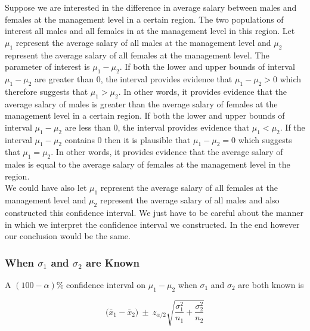 Suppose we are interested in the difference in average salary between males and females at the management level in a certain region. The two populations of interest all males and all females in at the management level in this region. Let $\mu_{1}$ represent the average salary of all males at the management level and $\mu_{2}$ represent the average salary of all females at the management level. The parameter of interest is $\mu_{1} - \mu_{2}$. If both the lower and upper bounds of interval $\mu_{1} - \mu_{2}$ are greater than $0$, the interval provides evidence that $\mu_{1} - \mu_{2} > 0$ 
which therefore suggests that $\mu_{1} > \mu_{2}$. In other words, it provides evidence that the average salary of males is greater than the average salary of females at the management level in a certain region. If both the lower and upper bounds of interval $\mu_{1} - \mu_{2}$ are less than $0$, the interval provides evidence that $\mu_{1} < \mu_{2}$. If the interval $\mu_{1} - \mu_{2}$ contains 0 then it is plausible that $\mu_{1} - \mu_{2} = 0$ which suggests that $\mu_{1} = \mu_{2}$. In other words, it provides evidence that the average salary of males is equal to the average salary of females at the management level in the region.\\

We could have also let  $\mu_{1}$ represent the average salary
of all females at the management level and $\mu_{2}$ represent the average salary of all males and also constructed this confidence interval. We just have to be careful about the manner in which we interpret the
confidence interval we constructed. In the end however our conclusion would be the same.

\subsubsection{When $\sigma_{1}$ and $\sigma_{2}$ are Known} 


\begin{ci}
A $(100 - \alpha)\%$ confidence interval on $\mu_{1} - \mu_{2}$ 
when $\sigma_{1}$ and $\sigma_{2}$ are both known is

\begin{equation}
\label{eqnCiTwoSampleMeanSigmasKnown}
\big(\bar{x}_{1}	 - \bar{x}_{2}\big)	~\pm~		z_{\alpha / 2}  
\sqrt{ \displaystyle\frac{\sigma_{1}^{2} }{ n_{1} }  +  \frac{\sigma_{2}^{2} }{ n_{2}  }  }
\end{equation}

\end{ci}

